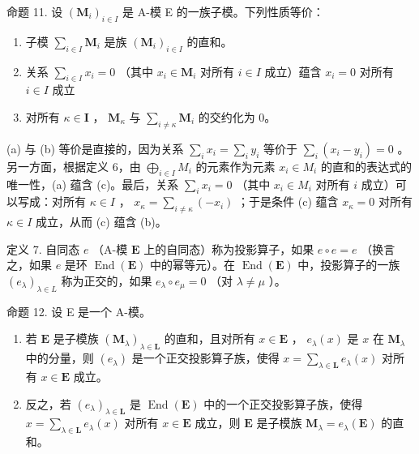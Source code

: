 命题 11. 设 \((\mathbf{M}_{i})_{i\in I}\) 是 A-模 E 的一族子模。下列性质等价：

\begin{enumerate}
\def\labelenumi{(\alph{enumi})}
\item
  子模 \(\sum_{i\in I}\mathbf{M}_i\) 是族 \((\mathbf{M}_i)_{i\in I}\) 的直和。
\item
  关系 \(\sum_{i\in I}x_i = 0\) （其中 \(x_{i}\in \mathbf{M}_{i}\) 对所有 \(i\in I\) 成立）蕴含 \(x_{i} = 0\) 对所有 \(i\in I\) 成立
\item
  对所有 \(\kappa \in \mathbf{I}\) ， \(\mathbf{M}_{\kappa}\) 与 \(\sum_{i \neq \kappa} \mathbf{M}_i\) 的交约化为 0。
\end{enumerate}

(a) 与 (b) 等价是直接的，因为关系 \(\sum_{i} x_{i} = \sum_{i} y_{i}\) 等价于 \(\sum_{i} (x_{i} - y_{i}) = 0\) 。另一方面，根据定义 6，由 \(\bigoplus_{i \in I} M_{i}\) 的元素作为元素 \(x_{i} \in M_{i}\) 的直和的表达式的唯一性，(a) 蕴含 (c)。最后，关系 \(\sum_{i} x_{i} = 0\) （其中 \(x_{i} \in M_{i}\) 对所有 \(i\) 成立）可以写成：对所有 \(\kappa \in I\) ， \(x_{\kappa} = \sum_{i \neq \kappa} (-x_{i})\) ；于是条件 (c) 蕴含 \(x_{\kappa} = 0\) 对所有 \(\kappa \in I\) 成立，从而 (c) 蕴含 (b)。

定义 7. 自同态 \(e\) （A-模 \(\mathbf{E}\) 上的自同态）称为投影算子，如果 \(e \circ e = e\) （换言之，如果 \(e\) 是环 \(\operatorname{End}(\mathbf{E})\) 中的幂等元）。在 \(\operatorname{End}(\mathbf{E})\) 中，投影算子的一族 \((e_{\lambda})_{\lambda \in L}\) 称为正交的，如果 \(e_{\lambda} \circ e_{\mu} = 0\) （对 \(\lambda \neq \mu\) ）。

命题 12. 设 E 是一个 A-模。

\begin{enumerate}
\def\labelenumi{(\roman{enumi})}
\item
  若 \(\mathbf{E}\) 是子模族 \((\mathbf{M}_{\lambda})_{\lambda \in \mathbf{L}}\) 的直和，且对所有 \(x \in \mathbf{E}\) ， \(e_{\lambda}(x)\) 是 \(x\) 在 \(\mathbf{M}_{\lambda}\) 中的分量，则 \((e_{\lambda})\) 是一个正交投影算子族，使得 \(x = \sum_{\lambda \in \mathbf{L}} e_{\lambda}(x)\) 对所有 \(x \in \mathbf{E}\) 成立。
\item
  反之，若 \((e_{\lambda})_{\lambda \in \mathbf{L}}\) 是 \(\operatorname{End}(\mathbf{E})\) 中的一个正交投影算子族，使得 \(x = \sum_{\lambda \in \mathbf{L}} e_{\lambda}(x)\) 对所有 \(x \in \mathbf{E}\) 成立，则 \(\mathbf{E}\) 是子模族 \(\mathbf{M}_{\lambda} = e_{\lambda}(\mathbf{E})\) 的直和。
\end{enumerate}

